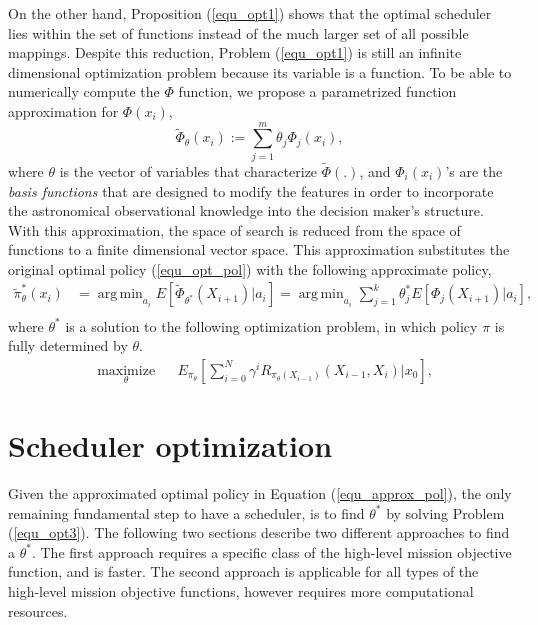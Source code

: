 \documentclass[12pt]{aastex62}
\theoremstyle{definition}
\DeclareMathOperator*{\argmin}{arg\,min}
\begin{document}
On the other hand, Proposition (\ref{equ_opt1}) shows that the optimal scheduler lies within the set of functions instead of the much larger set of all possible mappings. Despite this reduction, Problem (\ref{equ_opt1}) is still an infinite dimensional optimization problem because its variable is a function. To be able to numerically compute the $\Phi$ function, we propose a parametrized function approximation for $\Phi(x_{i})$,
\begin{equation*}
 \tilde{\Phi}_{\theta}({x}_{i}) := \sum_{j=1}^m \theta_j \Phi_j(x_{i}),
\end{equation*}
where $\theta$ is the vector of variables that characterize $\tilde{\Phi}(.)$, and $\Phi_i(x_i)$'s are the \textit{basis functions} that are designed to modify the features in order to incorporate the astronomical observational knowledge into the decision maker's structure. With this approximation, the space of search is reduced from the space of functions to a finite dimensional vector space. This approximation substitutes the original optimal policy (\ref{equ_opt_pol}) with the following approximate policy,
\begin{equation}\label{equ_approx_pol}
\begin{aligned}
\tilde{\pi}_{\theta}^*(x_{i})& = \argmin_{a_{i}} E[ \tilde{\Phi}_{\theta^*}(X_{i+1}) | a_{i}] =  \argmin_{a_{i}} \sum_{j=1}^k \theta^*_j E[\Phi_j(X_{i+1}) | a_{i}],\\
\end{aligned}
\end{equation}
where $\theta^*$ is a solution to the following optimization problem, in which policy $\pi$ is fully determined by $\theta$.
\begin{equation}\label{equ_opt3}
\begin{aligned}
& \underset{\theta}{\text{maximize}}
& & E_{\pi_{\theta}}[\sum_{i=0}^N \gamma^i R_{\pi_{\theta} (X_{i-1})}(X_{{i-1}}, X_{i}) | x_0],
\end{aligned}
\end{equation}

\section{Scheduler optimization}\label{sec_opt}
Given the approximated optimal policy in Equation (\ref{equ_approx_pol}), the only remaining fundamental step to have a scheduler, is to find $\theta^*$ by solving Problem (\ref{equ_opt3}). The following two sections describe two different approaches to find a $\theta^*$. The first approach requires a specific class of the high-level mission objective function, and is faster. The second approach is applicable for all types of the high-level mission objective functions, however requires more computational resources. 
\end{document}
